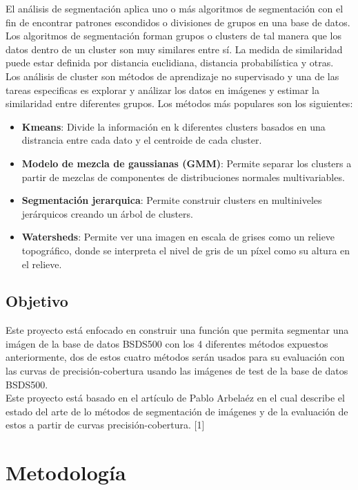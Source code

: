 \documentclass[10pt,twocolumn,letterpaper]{article}
\begin{document}
El an\'alisis de segmentaci\'on aplica uno o m\'as algoritmos de segmentaci\'on con el fin de encontrar patrones escondidos o divisiones de grupos en una base de datos. Los algoritmos de segmentaci\'on forman grupos o clusters de tal manera que los datos dentro de un cluster son muy similares entre s\'i. La medida de similaridad puede estar definida por distancia euclidiana, distancia probabil\'istica y otras.\\
Los an\'alisis de cluster son m\'etodos de aprendizaje no supervisado y una de las tareas especificas es explorar y an\'alizar los datos en im\'agenes y estimar la similaridad entre diferentes grupos. Los m\'etodos m\'as populares son los siguientes:
\begin{itemize}
\item \textbf{Kmeans}: Divide la informaci\'on en k diferentes clusters basados en una distrancia entre cada dato y el centroide de cada cluster.
\item \textbf{Modelo de mezcla de gaussianas (GMM)}: Permite separar los clusters a partir de mezclas de componentes de distribuciones normales multivariables.
\item \textbf{Segmentaci\'on jerarquica}: Permite construir clusters en multiniveles jer\'arquicos creando un \'arbol de clusters.
\item \textbf{Watersheds}: Permite ver una imagen en escala de grises como un relieve topográfico, donde se interpreta el nivel de gris de un píxel como su altura en el relieve. 
\end{itemize}
\subsection{Objetivo}
Este proyecto está enfocado en construir una función que permita segmentar una imágen de la base de datos BSDS500 con los 4 diferentes métodos expuestos anteriormente, dos de estos cuatro métodos serán usados para su evaluación con las curvas de precisión-cobertura usando las imágenes de test de la base de datos BSDS500.\\

Este proyecto está basado en el artículo de Pablo Arbelaéz  en el cual describe el estado del arte de lo métodos de segmentación de imágenes y de la evaluación de estos a partir de curvas precisión-cobertura. [1]


\section{Metodología}
\end{document}
